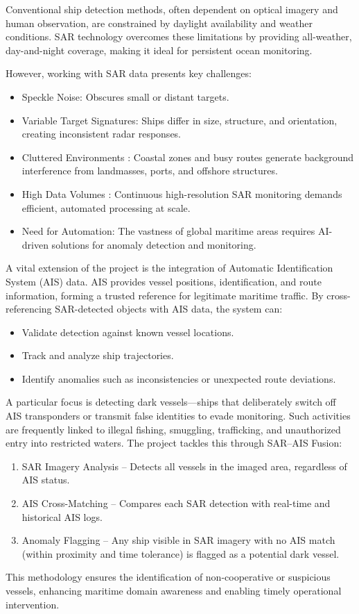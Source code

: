 \documentclass{article}
\begin{document}
	Conventional ship detection methods, often dependent on optical imagery and human observation, are constrained by daylight availability and weather conditions. SAR technology overcomes these limitations by providing all-weather, day-and-night coverage, making it ideal for persistent ocean monitoring.
	
	However, working with SAR data presents key challenges:
	\begin{itemize}
		\item Speckle Noise: Obscures small or distant targets.
		\item 	Variable Target Signatures: Ships differ in size, structure, and orientation, creating inconsistent radar responses.
		\item Cluttered Environments : Coastal zones and busy routes generate background interference from landmasses, ports, and offshore structures.
		\item High Data Volumes : Continuous high-resolution SAR monitoring demands efficient, automated processing at scale.
		\item 	Need for Automation: The vastness of global maritime areas requires AI-driven solutions for anomaly detection and monitoring.
	\end{itemize}
	A vital extension of the project is the integration of Automatic Identification System (AIS) data. AIS provides vessel positions, identification, and route information, forming a trusted reference for legitimate maritime traffic. By cross-referencing SAR-detected objects with AIS data, the system can:
	\begin{itemize}
		\item Validate detection against known vessel locations.
		\item Track and analyze ship trajectories.
		\item Identify anomalies such as inconsistencies or unexpected route deviations.
	\end{itemize}
	
	A particular focus is detecting dark vessels—ships that deliberately switch off AIS transponders or transmit false identities to evade monitoring. Such activities are frequently linked to illegal fishing, smuggling, trafficking, and unauthorized entry into restricted waters.
	The project tackles this through SAR–AIS Fusion:
	\begin{enumerate}
		\item SAR Imagery Analysis – Detects all vessels in the imaged area, regardless of AIS status.
		\item AIS Cross-Matching – Compares each SAR detection with real-time and historical AIS logs.
		\item Anomaly Flagging – Any ship visible in SAR imagery with no AIS match (within proximity and time tolerance) is flagged as a potential dark vessel.
	\end{enumerate}
	This methodology ensures the identification of non-cooperative or suspicious vessels, enhancing maritime domain awareness and enabling timely operational intervention.\\
	
\end{document}
